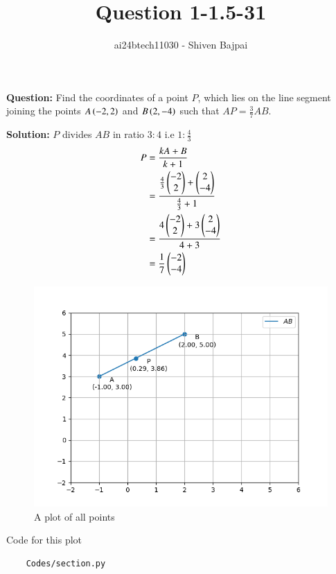 \documentclass[journal]{IEEEtran}
\begin{document}
\onecolumn

\vspace{3cm}

\renewcommand{\thefigure}{\theenumi}
\renewcommand{\thetable}{\theenumi}

\title{Question 1-1.5-31}
\author{ai24btech11030 - Shiven Bajpai}
\maketitle

\renewcommand{\thefigure}{\theenumi}
\renewcommand{\thetable}{\theenumi}

\textbf{Question: } Find the coordinates of a point $P$, which lies on the line segment joining the points $A \left(-2, 2\right)$ and $B \left(2, -4\right)$ such that $AP = \frac{3}{7}AB$.	

\textbf{Solution: } $P$ divides $AB$ in ratio $3:4$ i.e $1:\frac{4}{3}$
\begin{align}
	P &= \frac{kA + B}{k + 1} \\
	&= \frac{\frac{4}{3}\begin{pmatrix}-2 \\ 2\end{pmatrix} + \begin{pmatrix}2 \\ -4\end{pmatrix}}{\frac{4}{3} + 1} \\
	&= \frac{4\begin{pmatrix}-2 \\ 2\end{pmatrix} + 3\begin{pmatrix}2 \\ -4\end{pmatrix}}{4 + 3} \\
	&= \frac{1}{7}\begin{pmatrix}-2 \\ -4\end{pmatrix}
\end{align}

\begin{figure}[H]
	\centering
	\includegraphics[width=0.75\columnwidth]{Figures/Figure.png}
	\caption{A plot of all points}
	\label{fig}
\end{figure}

Code for this plot
\begin{lstlisting}
	Codes/section.py
\end{lstlisting}
\end{document}
